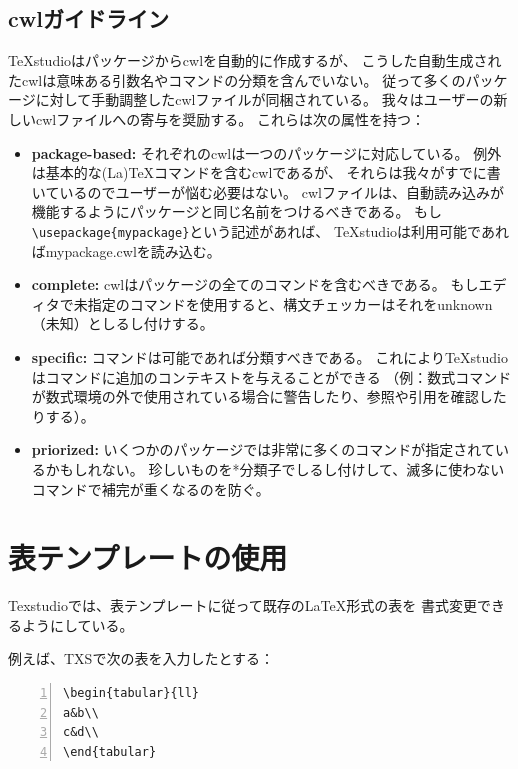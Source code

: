 \subsection{cwlガイドライン}

TeXstudioはパッケージからcwlを自動的に作成するが、
こうした自動生成されたcwlは意味ある引数名やコマンドの分類を含んでいない。
従って多くのパッケージに対して手動調整したcwlファイルが同梱されている。
我々はユーザーの新しいcwlファイルへの寄与を奨励する。
これらは次の属性を持つ：

\begin{itemize}
\item
  \textbf{package-based:}
  それぞれのcwlは一つのパッケージに対応している。
  例外は基本的な(La)TeXコマンドを含むcwlであるが、
  それらは我々がすでに書いているのでユーザーが悩む必要はない。
  cwlファイルは、自動読み込みが機能するようにパッケージと同じ名前をつけるべきである。
  もし\verb+\usepackage{mypackage}+という記述があれば、
  TeXstudioは利用可能であればmypackage.cwlを読み込む。
\item
  \textbf{complete:} cwlはパッケージの全てのコマンドを含むべきである。
  もしエディタで未指定のコマンドを使用すると、構文チェッカーはそれをunknown（未知）としるし付けする。
\item
  \textbf{specific:} コマンドは可能であれば分類すべきである。
  これによりTeXstudioはコマンドに追加のコンテキストを与えることができる
  （例：数式コマンドが数式環境の外で使用されている場合に警告したり、参照や引用を確認したりする）。
\item
  \textbf{priorized:}
  いくつかのパッケージでは非常に多くのコマンドが指定されているかもしれない。
  珍しいものを*分類子でしるし付けして、滅多に使わないコマンドで補完が重くなるのを防ぐ。
\end{itemize}

\section{表テンプレートの使用}

Texstudioでは、表テンプレートに従って既存のLaTeX形式の表を
書式変更できるようにしている。

例えば、TXSで次の表を入力したとする：

\begin{lstlisting}[frame=single,numbers=left]
\begin{tabular}{ll}
a&b\\
c&d\\
\end{tabular}
\end{lstlisting}


